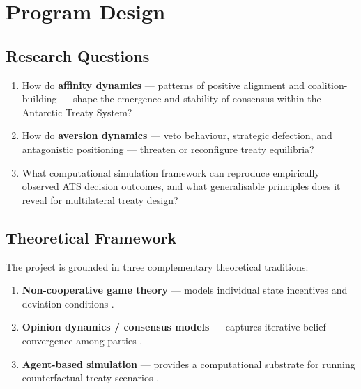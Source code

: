 \chapter{Program Design}
\label{ch:program}

\section{Research Questions}
\label{sec:rqs}

\begin{rqbox}
  \begin{enumerate}[label=\textbf{RQ\arabic*.}, leftmargin=*, itemsep=6pt]
    \item How do \textbf{affinity dynamics} — patterns of positive alignment and
          coalition-building — shape the emergence and stability of consensus
          within the Antarctic Treaty System?
    \item How do \textbf{aversion dynamics} — veto behaviour, strategic defection,
          and antagonistic positioning — threaten or reconfigure treaty equilibria?
    \item What computational simulation framework can reproduce empirically observed
          ATS decision outcomes, and what generalisable principles does it reveal
          for multilateral treaty design?
  \end{enumerate}
\end{rqbox}

\section{Theoretical Framework}
\label{sec:theory}

The project is grounded in three complementary theoretical traditions:

\begin{enumerate}
  \item \textbf{Non-cooperative game theory} — models individual state incentives and
        deviation conditions \parencite{Nash1951, Osborne1994}.
  \item \textbf{Opinion dynamics / consensus models} — captures iterative belief
        convergence among parties \parencite{DeGroot1974}.
  \item \textbf{Agent-based simulation} — provides a computational substrate for
        running counterfactual treaty scenarios \parencite{Epstein1996}.
\end{enumerate}

